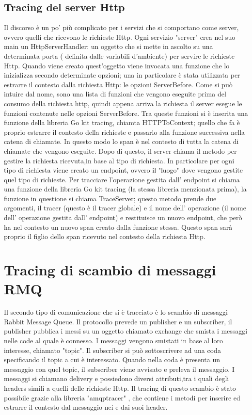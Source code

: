 \documentclass[a4paper,12pt,titlepage,italian,openany]{report}
\begin{document}
\subsection{Tracing del server Http}
Il discorso è un po' più complicato per i servizi che si comportano come server, ovvero quelli che ricevono le richieste Http. 
Ogni servizio "server" crea nel suo main un HttpServerHandler: un oggetto che si mette in ascolto su una determinata porta 
( definita dalle variabili d'ambiente) per servire le richieste Http. Quando viene creato quest'oggetto viene invocata una 
funzione che lo inizializza secondo determinate opzioni; una in particolare è stata utilizzata per estrarre il contesto dalla richiesta Http: le opzioni ServerBefore.
 Come si può intuire dal nome, sono una lista di funzioni che vengono eseguite prima del consumo della richiesta http, quindi appena
  arriva la richiesta il server esegue le funzioni contenute nelle opzioni ServerBefore. Tra queste funzioni
   si è inserita una funzione della libreria Go kit tracing, chiamta HTTPToContext; quello che fa è proprio estrarre il contesto
    della richieste e passarlo alla funzione successiva nella catena di chiamate. In questo modo  lo span è nel contesto di tutta
     la catena di chiamate che vengono eseguite.
Dopo di questo, il server chiama il metodo per gestire la richiesta ricevuta,in base al tipo di richiesta. In particolare per ogni tipo di richiesta viene creato un endpoint,
ovvero il "luogo" dove vengono gestite quel tipo di richieste. Per tracciare l'operazione gestita dall'
endpoint si chiama una funzione della libreria Go kit tracing (la stessa libreria menzionata prima), la funzione in questione si chiama TraceServer; questo metodo prende due argomenti, il tracer (questo è il tracer globale) e il nome dell' operazione (il nome dell' operazione gestita dall' endpoint) e restituisce un nuovo endpoint, che però ha nel contesto un nuovo span creato dalla funzione stessa. Questo span sarà proprio il figlio dello span ricevuto nel contesto della richiesta Http. 

\section{Tracing di scambio di messaggi RMQ}
Il secondo tipo di comunicazione che si è tracciato è lo scambio di messaggi Rabbit Message Queue. Il protocollo prevede un publisher e un subscriber, il publisher pubblica i messi su un oggetto chiamato exchange che smista i messaggi nelle code al quale è connesso. I messaggi vengono smistati in base al loro interesse, chiamato "topic". Il subscriber si può sottoscrivere ad una coda specificando il topic a cui è interessato. Quando nella coda è presenta un messaggio con quel topic, il subscriber viene avvisato e preleva il messaggio. I messaggi si chiamano delivery e possiedono diversi attributi,tra i quali degli headers simili a quelli delle richieste Http.
Il tracing di questo scambio è stato possibile grazie alla libreria "amqptracer"
, che contiene i metodi per inserire ed estrarre il contesto dal messaggio nei e dai suoi header.
\end{document}

